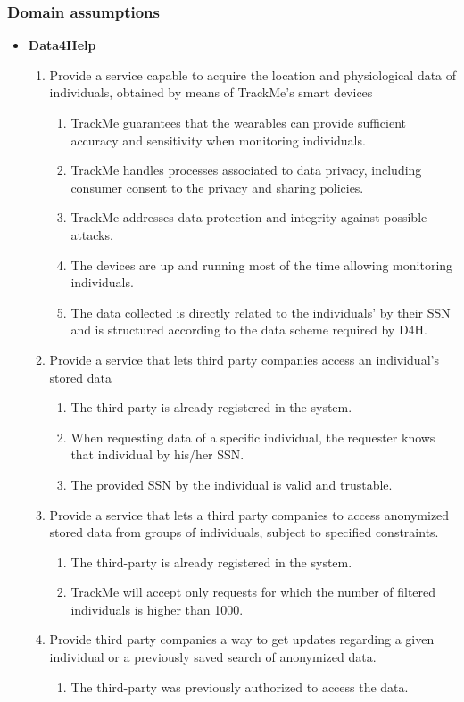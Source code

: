 \documentclass[12pt]{article}
\newcommand\goal[1]{\item[{[G#1]}] }
\newcommand\assumption[1]{\item[{[D#1]}] }
\begin{document}
\subsubsection{Domain assumptions}
\begin{itemize}
  \item{\textbf{Data4Help}}
  \begin{enumerate}
    \goal{1} Provide a service capable to acquire the location and physiological data of individuals, obtained by means of TrackMe's smart devices
    \begin{enumerate}
      \assumption{1} TrackMe guarantees that the wearables can provide sufficient accuracy and sensitivity when monitoring individuals.
      \assumption{2} TrackMe handles processes associated to data privacy, including consumer consent to the privacy and sharing policies. 
      \assumption{3} TrackMe addresses data protection and integrity against possible attacks.
      \assumption{4} The devices are up and running most of the time allowing monitoring individuals. 
      \assumption{5} The data collected is directly related to the individuals’ by their SSN and is structured according to the data scheme required by D4H.
    \end{enumerate}
  
    \goal{2} Provide a service that lets third party companies access an individual's stored data 
    \begin{enumerate}
      \assumption{6} The third-party is already registered in the system.
      \assumption{7} When requesting data of a specific individual, the requester knows that individual by his/her SSN.
      \assumption{8} The provided SSN by the individual is valid and trustable.
    \end{enumerate}
        
     \goal{3}  Provide a service that lets a third party companies to access anonymized stored data from groups of individuals, subject to specified constraints.
    \begin{enumerate}
      \assumption{6} The third-party is already registered in the system.
      \assumption{9} TrackMe will accept only requests for which the number of filtered individuals is higher than 1000.
    \end{enumerate}
        
     \goal{4}  Provide third party companies a way to get updates regarding a given individual or a previously saved search of anonymized data.
    \begin{enumerate}
      \assumption{10} The third-party was previously authorized to access the data.
    \end{enumerate}
    
     \end{enumerate}
\end{itemize}
\end{document}
